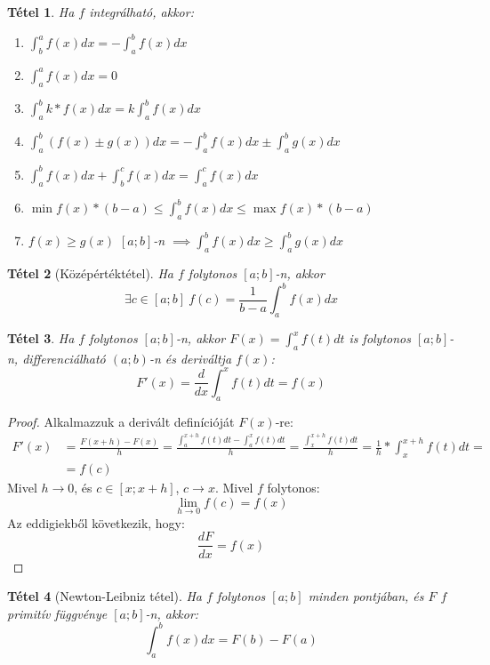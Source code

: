 \documentclass[twoside,12pt]{report}
\newtheorem{theorem}{Tétel}[section]
\theoremstyle{definition}
\begin{document}
	\begin{theorem}
		Ha $f$ integrálható, akkor:
		\begin{enumerate}
			\item $\int_{b}^{a}f(x)dx=-\int_{a}^{b}f(x)dx$
			\item $\int_{a}^{a}f(x)dx=0$
			\item $\int_{a}^{b}k*f(x)dx=k\int_{a}^{b}f(x)dx$
			\item $\int_{a}^{b}(f(x)\pm g(x))dx=-\int_{a}^{b}f(x)dx\pm\int_{a}^{b}g(x)dx$
			\item $\int_{a}^{b}f(x)dx+\int_{b}^{c}f(x)dx=\int_{a}^{c}f(x)dx$
			\item $\min f(x)*(b-a)\le\int_{a}^{b}f(x)dx\le\max f(x)*(b-a)$
			\item $f(x)\ge g(x)$ $[a;b]$-n $\implies\int_{a}^{b}f(x)dx\ge\int_{a}^{b}g(x)dx$
		\end{enumerate}
	\end{theorem}
	\begin{theorem}[Középértéktétel]
		Ha $f$ folytonos $[a;b]$-n, akkor
		\begin{equation*}
			\exists c\in[a;b]\ f(c)=\frac{1}{b-a}\int_{a}^{b}f(x)dx
		\end{equation*}
	\end{theorem}
	\begin{theorem}
		Ha $f$ folytonos $[a;b]$-n, akkor $F(x)=\int_{a}^{x}f(t)dt$ is folytonos $[a;b]$-n, differenciálható $(a;b)$-n és deriváltja $f(x)$:
		\begin{equation*}
			F'(x)=\frac{d}{dx}\int_{a}^{x}f(t)dt=f(x)
		\end{equation*}
	\end{theorem}
	\begin{proof}
		Alkalmazzuk a derivált definícióját $F(x)$-re:
		\begin{align*}
			F'(x)&=\frac{F(x+h)-F(x)}{h}=\frac{\int_{a}^{x+h}f(t)dt-\int_{a}^{x}f(t)dt}{h}=\frac{\int_{x}^{x+h}f(t)dt}{h}=\frac{1}{h}*\int_{x}^{x+h}f(t)dt=\tag{Középértéktétel miatt}\\
			&=f(c)
		\end{align*}
		Mivel $h\to0$, és $c\in[x;x+h]$, $c\to x$. Mivel $f$ folytonos:
		\begin{equation*}
			\lim\limits_{h\to0}f(c)=f(x)
		\end{equation*}
		Az eddigiekből következik, hogy:
		\begin{equation*}
		\frac{dF}{dx}=f(x)
		\end{equation*}
	\end{proof}
	\begin{theorem}[Newton-Leibniz tétel]
		Ha $f$ folytonos $[a;b]$ minden pontjában, és $F$ $f$ primitív függvénye $[a;b]$-n, akkor:
		\begin{equation*}
			\int_{a}^{b}f(x)dx=F(b)-F(a)
		\end{equation*}
	\end{theorem}
\end{document}
